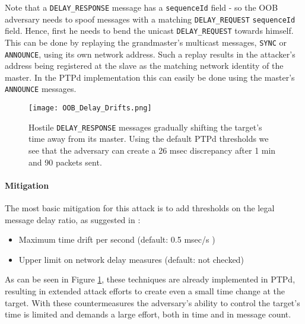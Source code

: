 \documentclass[11pt]{article}
\begin{document}
Note that a \texttt{DELAY_RESPONSE} message has a \texttt{sequenceId} field - so the OOB adversary needs to spoof messages with a matching \texttt{DELAY_REQUEST} \texttt{sequenceId} field. Hence, first he needs to bend the unicast \texttt{DELAY_REQUEST} towards himself. This can be done by replaying the grandmaster's multicast messages, \texttt{SYNC} or \texttt{ANNOUNCE}, using its own network address. Such a replay results in the attacker's address being registered at the slave as the matching network identity of the master. In the PTPd implementation this can easily be done using the master's \texttt{ANNOUNCE} messages.



\begin{figure}[t]

\centerline{\texttt{[image: OOB\_Delay\_Drifts.png]}}

\caption{Hostile \texttt{DELAY_RESPONSE} messages gradually shifting the target's time away from its master. Using the default PTPd thresholds we see that the adversary can create a 26 msec discrepancy after 1 min and 90 packets sent.}

\label{Delay Spoofing}

\end{figure}



\paragraph{Mitigation}\label{time:scenario1mit}

The most basic mitigation for this attack is to add thresholds on the legal message delay ratio, as suggested in \cite{Delay_Filter_1}:

\begin{itemize}

  \item Maximum time drift per second (default: 0.5 msec/s )

  \item Upper limit on network delay measures (default: not checked)

\end{itemize}

As can be seen in Figure \ref{Delay Spoofing}, these techniques are already implemented in PTPd, resulting in extended attack efforts to create even a small time change at the target. With these countermeasures the adversary's ability to control the target's time is limited and demands a large effort, both in time and in message count.
\end{document}
